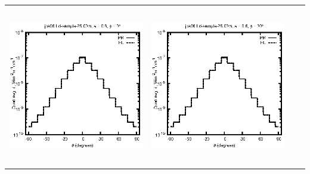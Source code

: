 \begin{tabular}{c c c c}
\includegraphics[height=7cm]{../eps/jok06_Ld_sample_25.00m_fwd.eps} &
\includegraphics[height=7cm]{../eps/jok06_Ld_sample_25.00m_cross.eps} \\
\end{tabular}

\pagebreak

